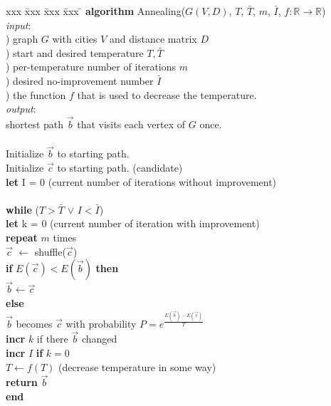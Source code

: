 \documentclass{article}
\begin{document}
\begin{tabbing}
xxx \= xxx \= xxx \= xxx \= \kill
\textbf{algorithm} Annealing($G(V, D)$, $T$, $\bar{T}$, $m$, $\bar{I}$, $f: \mathbb{R} \rightarrow \mathbb{R}$) \\ 
\textit{input}:                                         \\
) graph $G$ with cities $V$ and distance matrix $D$ \\ 
) start and desired temperature $T, \bar{T}$        \\
) per-temperature number of iterations $m$          \\
) desired no-improvement number $\bar{I}$           \\
) the function $f$ that is used to decrease the temperature. \\
\textit{output}: \\
\> shortest path $\vec{b}$ that visits each vertex of $G$ once. \\
\\ 
\> Initialize $\vec{b}$ to starting path. \\
\> Initialize $\vec{c}$ to starting path. (candidate) \\
\> \textbf{let} I = 0 (current number of iterations without improvement) \\
\> \\
\> \textbf{while} ($T > \bar{T}$ $\lor$ $I < \bar{I}$) \\
\>\> \textbf{let} k = 0 (current number of iteration with improvement) \\
\>\> \textbf{repeat} $m$ times \\
\>\>\> $\vec{c}$ $\leftarrow$ shuffle($\vec{c}$) \\
\>\>\> \textbf{if} $E(\vec{c}) < E(\vec{b})$ \textbf{then} \\
\>\>\>\> $\vec{b} \leftarrow \vec{c}$ \\
\>\>\> \textbf{else} \\
\>\>\>\> $\vec{b}$ becomes $\vec{c}$ with probability $P = e^{\frac{E(\vec{b}) - E(\vec{c})}{T}}$ \\
\>\>\> \textbf{incr} $k$ if there $\vec{b}$ changed \\
\>\> \textbf{incr} $I$ \textbf{if} $k = 0$ \\
\>\> $T \leftarrow f(T)$ (decrease temperature in some way) \\
\> \textbf{return} $\vec{b}$ \\
\textbf{end}
\end{tabbing}
\end{document}
